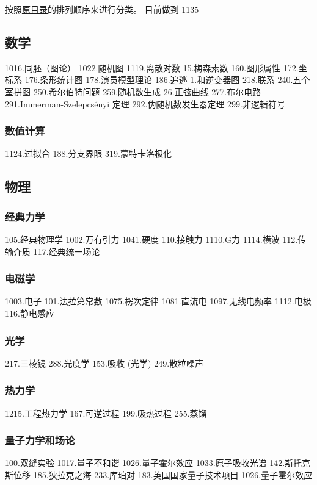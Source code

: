 
\begin{issues}
\issueDraft
\end{issues}

按照\href{https://wuli.wiki/assets/sogou}{原目录}的排列顺序来进行分类。 目前做到 1135

\subsection{数学}
1016.同胚（图论）
1022.随机图
1119.离散对数
15.梅森素数
160.图形属性
172.坐标系
176.条形统计图
178.演员模型理论
186.追逃
1.和逆变器图
218.联系
240.五个室拼图
250.希尔伯特问题
259.随机数生成
26.正弦曲线
277.布尔电路
291.Immerman-Szelepcsényi 定理
292.伪随机数发生器定理
299.非逻辑符号
\subsubsection{数值计算}
1124.过拟合
188.分支界限
319.蒙特卡洛极化

\subsection{物理}
\subsubsection{经典力学}
105.经典物理学
1002.万有引力
1041.硬度
110.接触力
1110.G力
1114.横波
112.传输介质
117.经典统一场论
\subsubsection{电磁学}
1003.电子
101.法拉第常数
1075.楞次定律
1081.直流电
1097.无线电频率
1112.电极
116.静电感应
\subsubsection{光学}
217.三棱镜
288.光度学
153.吸收 (光学)
249.散粒噪声
\subsubsection{热力学}
1215.工程热力学
167.可逆过程
199.吸热过程
255.蒸馏
\subsubsection{量子力学和场论}
100.双缝实验
1017.量子不和谐
1026.量子霍尔效应
1033.原子吸收光谱
142.斯托克斯位移
185.狄拉克之海
233.库珀对
183.英国国家量子技术项目
1026.量子霍尔效应
